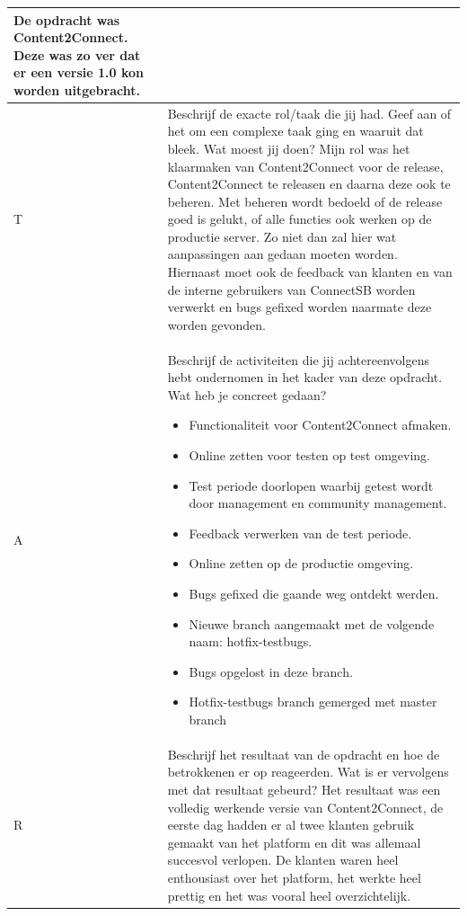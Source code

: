 \begin{tabularx}{\textwidth}{| l | X |}
\newline
\newline
De opdracht was Content2Connect. Deze was zo ver dat er een versie 1.0 kon worden uitgebracht. \\
\hline
T & Beschrijf de exacte rol/taak die jij had. Geef aan of het om een complexe taak ging en waaruit dat bleek. Wat moest jij doen?
\newline
\newline
Mijn rol was het klaarmaken van Content2Connect voor de release, Content2Connect te releasen en daarna deze ook te beheren. Met beheren wordt bedoeld of de release goed is gelukt, of alle functies ook werken op de productie server. Zo niet dan zal hier wat aanpassingen aan gedaan moeten worden. Hiernaast moet ook de feedback van klanten en van de interne gebruikers van ConnectSB worden verwerkt en bugs gefixed worden naarmate deze worden gevonden.
\\
\hline
A & Beschrijf de activiteiten die jij achtereenvolgens hebt ondernomen in het kader van deze opdracht. Wat heb je concreet gedaan?
\begin{itemize}
\item Functionaliteit voor Content2Connect afmaken.
\item Online zetten voor testen op test omgeving.
\item Test periode doorlopen waarbij getest wordt door management en community management.
\item Feedback verwerken van de test periode.
\item Online zetten op de productie omgeving.
\item Bugs gefixed die gaande weg ontdekt werden.
\item Nieuwe branch aangemaakt met de volgende naam: hotfix-testbugs.
\item Bugs opgelost in deze branch.
\item Hotfix-testbugs branch gemerged met master branch
\end{itemize}
\\
\hline
R & Beschrijf het resultaat van de opdracht en hoe de betrokkenen er op reageerden. Wat is er vervolgens met dat resultaat gebeurd?
\newline
\newline
Het resultaat was een volledig werkende versie van  Content2Connect, de eerste dag hadden er al twee klanten gebruik gemaakt van het platform en dit was allemaal succesvol verlopen. De klanten waren heel enthousiast over het platform, het werkte heel prettig en het was vooral heel overzichtelijk.

\end{tabularx}
